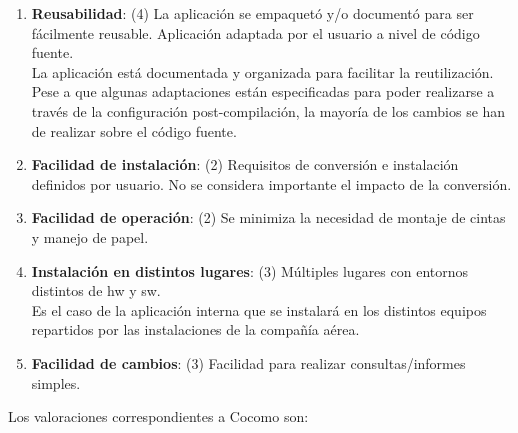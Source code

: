 \documentclass[11pt, a4paper, twoside]{report}
\begin{document}
\begin{enumerate}
					\item \textbf{Reusabilidad}: (4) La aplicación se empaquetó y/o documentó para ser fácilmente reusable.
Aplicación adaptada por el usuario a nivel de código fuente.\\
						La aplicación está documentada y organizada para facilitar la reutilización. Pese a que algunas adaptaciones están especificadas para poder realizarse a través de la configuración post-compilación, la mayoría de los cambios se han de realizar sobre el código fuente.
					\item \textbf{Facilidad de instalación}: (2) Requisitos de conversión e instalación definidos por usuario.
No se considera importante el impacto de la conversión.
					\item \textbf{Facilidad de operación}: (2) Se minimiza la necesidad de montaje de cintas y manejo de
papel.
					\item \textbf{Instalación en distintos lugares}: (3) Múltiples lugares con entornos distintos de hw y sw.\\
						Es el caso de la aplicación interna que se instalará en los distintos equipos repartidos por las instalaciones de la compañía aérea.
					\item \textbf{Facilidad de cambios}: (3) Facilidad para realizar consultas/informes simples.	
				\end{enumerate}

				Los valoraciones correspondientes a Cocomo son:
				
\end{document}
